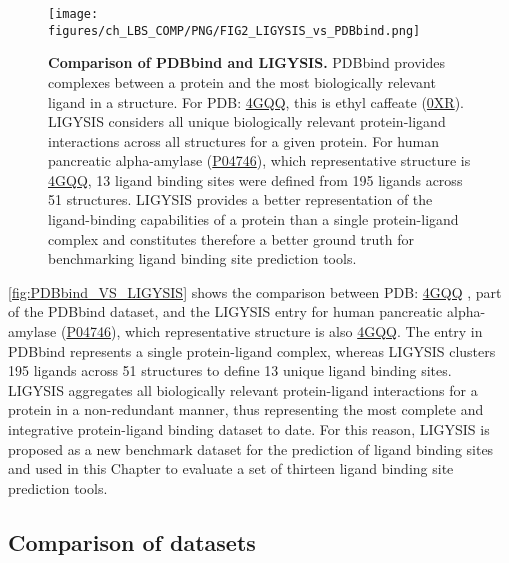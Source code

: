 \begin{figure}[htb!]
    \centering
    \texttt{[image: figures/ch\_LBS\_COMP/PNG/FIG2\_LIGYSIS\_vs\_PDBbind.png]}
    \caption[Comparison of PDBbind and LIGYSIS]{\textbf{Comparison of PDBbind and LIGYSIS.} PDBbind provides complexes between a protein and the most biologically relevant ligand in a structure. For PDB: \href{https://www.ebi.ac.uk/pdbe/entry/pdb/4GQQ}{4GQQ}, this is ethyl caffeate (\href{https://www.ebi.ac.uk/pdbe-srv/pdbechem/chemicalCompound/show/0XR}{0XR}). LIGYSIS considers all unique biologically relevant protein-ligand interactions across all structures for a given protein. For human pancreatic alpha-amylase (\href{https://www.uniprot.org/uniprotkb/P04746/entry}{P04746}), which representative structure is \href{https://www.ebi.ac.uk/pdbe/entry/pdb/4GQQ}{4GQQ}, 13 ligand binding sites were defined from 195 ligands across 51 structures. LIGYSIS provides a better representation of the ligand-binding capabilities of a protein than a single protein-ligand complex and constitutes therefore a better ground truth for benchmarking ligand binding site prediction tools.}
    \label{fig:PDBbind_VS_LIGYSIS}
\end{figure}

\autoref{fig:PDBbind_VS_LIGYSIS} shows the comparison between PDB: \href{https://www.ebi.ac.uk/pdbe/entry/pdb/4GQQ}{4GQQ} \cite{WILLIAMS_2012_AMYLASE}, part of the PDBbind dataset, and the LIGYSIS entry for human pancreatic alpha-amylase (\href{https://www.uniprot.org/uniprotkb/P04746/entry}{P04746}), which representative structure is also \href{https://www.ebi.ac.uk/pdbe/entry/pdb/4GQQ}{4GQQ}. The entry in PDBbind represents a single protein-ligand complex, whereas LIGYSIS clusters 195 ligands across 51 structures to define 13 unique ligand binding sites. LIGYSIS aggregates all biologically relevant protein-ligand interactions for a protein in a non-redundant manner, thus representing the most complete and integrative protein-ligand binding dataset to date. For this reason, LIGYSIS is proposed as a new benchmark dataset for the prediction of ligand binding sites and used in this Chapter to evaluate a set of thirteen ligand binding site prediction tools.

\subsection{Comparison of datasets}

